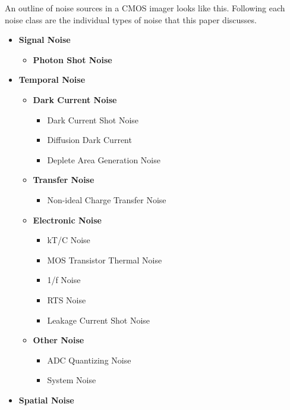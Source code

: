 \documentclass[10pt]{article}
\begin{document}
An outline of noise sources in a CMOS imager looks like this. Following each noise class are the individual types of noise that this paper discusses.

\begin{itemize}[noitemsep]
   \item \textbf{Signal Noise}
       \begin{itemize}[noitemsep]
          \item \textbf{Photon Shot Noise}
       \end{itemize}
   \item \textbf{Temporal Noise}
       \begin{itemize}[noitemsep]
          \item \textbf{Dark Current Noise}
             \begin{itemize}[noitemsep]
                \item Dark Current Shot Noise
                \item Diffusion Dark Current
                \item Deplete Area Generation Noise
             \end{itemize}
          \item \textbf{Transfer Noise}
             \begin{itemize}[noitemsep]
               \item Non-ideal Charge Transfer Noise
          \end{itemize}
          \item \textbf{Electronic Noise}
             \begin{itemize}[noitemsep]
                \item kT/C Noise
                \item MOS Transistor Thermal Noise
                \item 1/f Noise
                \item RTS Noise
                \item Leakage Current Shot Noise
             \end{itemize}
          \item \textbf{Other Noise}
             \begin{itemize}[noitemsep]
                \item ADC Quantizing Noise
                \item System Noise
             \end{itemize}
        \end{itemize} 
   \item \textbf{Spatial Noise}

\end{itemize}
\end{document}
